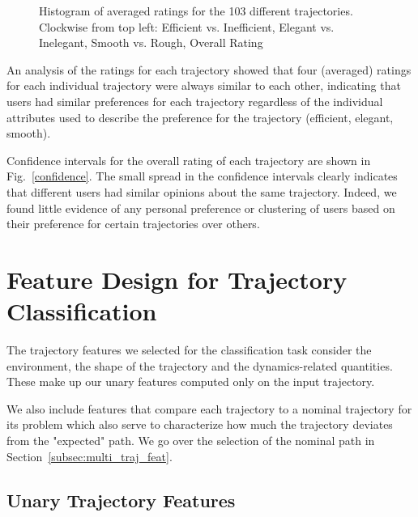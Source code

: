 \documentclass[letterpaper, 10 pt, conference]{ieeeconf}  %
\begin{document}
\begin{figure}[t]
  \caption{Histogram of averaged ratings for the 103 different trajectories. Clockwise from top left: Efficient vs. Inefficient, Elegant vs. Inelegant, Smooth vs. Rough, Overall Rating}
\label{fig:survey_raw}
\end{figure}


An analysis of the ratings for each trajectory showed that four (averaged) ratings for each individual trajectory were always similar to each other, indicating that users had similar preferences for each trajectory regardless of the individual attributes used to describe the preference for the trajectory (efficient, elegant, smooth). 

Confidence intervals for the overall rating of each trajectory are shown in Fig.~\ref{confidence}. The small spread in the confidence intervals clearly indicates that different users had similar opinions about the same trajectory. Indeed, we found little evidence of any personal preference or clustering of users based on their preference for certain trajectories over others. 

\section{Feature Design for Trajectory Classification}

The trajectory features we selected for the classification task consider the environment, the shape of the trajectory and the dynamics-related quantities. These make up our unary features computed only on the input trajectory. 

We also include features that compare each trajectory to a nominal trajectory for its problem which also serve to characterize how much the trajectory deviates from the "expected" path. We go over the selection of the nominal path in Section~\ref{subsec:multi_traj_feat}.

\subsection{Unary Trajectory Features}
\end{document}
